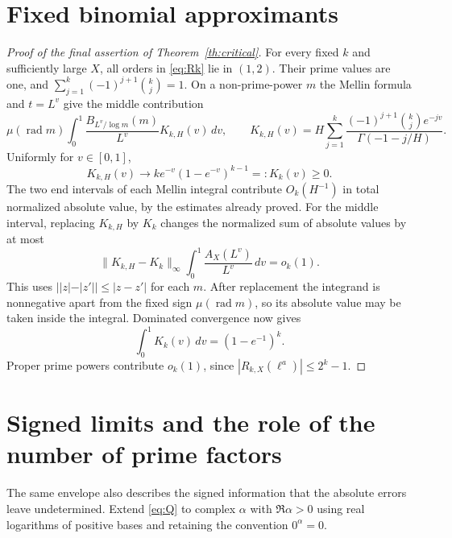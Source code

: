 \documentclass[11pt]{article}
\theoremstyle{remark}
\newcommand{\rad}{\operatorname{rad}}
\begin{document}
\section{Fixed binomial approximants}
\begin{proof}[Proof of the final assertion of Theorem~\ref{th:critical}]
For every fixed $k$ and sufficiently large $X$, all orders in
\eqref{eq:Rk} lie in $(1,2)$. Their prime values are one, and
$\sum_{j=1}^k(-1)^{j+1}\binom{k}{j}=1$.
On a non-prime-power $m$ the Mellin formula and $t=L^v$ give the
middle contribution
\[
 \mu(\rad m)\int_0^1
       \frac{B_{L^v/\log m}(m)}{L^v}K_{k,H}(v)\,dv,
 \qquad
 K_{k,H}(v)=H\sum_{j=1}^k
       \frac{(-1)^{j+1}\binom{k}{j}e^{-jv}}
            {\Gamma(-1-j/H)}.
\]
Uniformly for $v\in[0,1]$,
\begin{equation}\label{eq:binomial-kernel}
 K_{k,H}(v)\longrightarrow
       k e^{-v}(1-e^{-v})^{k-1}=:K_k(v)\ge0.
\end{equation}
The two end intervals of each Mellin integral contribute $O_k(H^{-1})$
in total normalized absolute value, by the estimates already proved.
For the middle interval, replacing $K_{k,H}$ by $K_k$ changes the
normalized sum of absolute values by at most
\[
 \|K_{k,H}-K_k\|_\infty
            \int_0^1\frac{A_X(L^v)}{L^v}\,dv=o_k(1).
\]
This uses $||z|-|z'||\le|z-z'|$ for each $m$. After replacement the
integrand is nonnegative apart from the fixed sign $\mu(\rad m)$,
so its absolute value may be taken inside the integral. Dominated
convergence now gives
\[
 \int_0^1K_k(v)\,dv=(1-e^{-1})^k.
\]
Proper prime powers contribute $o_k(1)$, since $|R_{k,X}(\ell^a)|\le2^k-1$.
\end{proof}

\section{Signed limits and the role of the number of prime factors}

The same envelope also describes the signed information that the
absolute errors leave undetermined. Extend \eqref{eq:Q} to complex
$\alpha$ with $\Re\alpha>0$ using real logarithms of positive bases
and retaining the convention $0^\alpha=0$.
\end{document}
